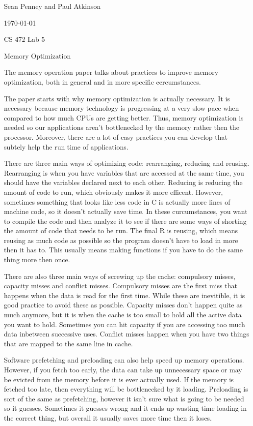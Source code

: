 \documentclass[letterpaper,12pt,titlepage]{article}
\def\name{Sean Penney and Paul Atkinson}
\begin{document}
\hfill \name

\hfill \today

\hfill CS 472 Lab 5


\centerline{\large Memory Optimization}
 
 
The memory operation paper talks about practices to improve memory optimization, both in general and in more specific cercumstances.
\newline
\par
The paper starts with why memory optimization is actually necessary. It is necessary because memory technology is progressing at a very
slow pace when compared to how much CPUs are getting better. Thus, memory optimization is needed so our applications aren't bottlenecked 
by the memory rather then the processor. Moreover, there are a lot of easy practices you can develop that subtely help the run time of 
applications.
\newline
\par
There are three main ways of optimizing code: rearranging, reducing and reusing. Rearranging is when you have variables that are accessed 
at the same time, you should have the variables declared next to each other. Reducing is reducing the amount of code to run, which obviously 
makes it more efficent. However, sometimes something that looks like less code in C is actually more lines of machine code, so it doesn't 
actually save time. In these curcumstances, you want to compile the code and then analyze it to see if there are some ways of shorting 
the amount of code that needs to be run. The final R is reusing, which means reusing as much code as possible so the program doesn't have 
to load in more then it has to. This usually means making functions if you have to do the same thing more then once.
\newline
\par
There are also three main ways of screwing up the cache: compulsory misses, capacity misses and conflict misses. Compulsory misses are 
the first miss that happens when the data is read for the first time. While these are inevitible, it is good practice to avoid these as 
possible. Capacity misses don't happen quite as much anymore, but it is when the cache is too small to hold all the active data you want 
to hold. Sometimes you can hit capacity if you are accessing too much data inbetween successive uses. Conflict misses happen when you have 
two things that are mapped to the same line in cache.
\newline
\par
Software prefetching and preloading can also help speed up memory operations. However, if you fetch too early, the data can take up 
unnecessary space or may be evicted from the memory before it is ever actually used. If the memory is fetched too late, then everything 
will be bottlenecked by it loading. Preloading is sort of the same as prefetching, however it isn't sure what is going to be needed 
so it guesses. Sometimes it guesses wrong and it ends up wasting time loading in the correct thing, but overall it usually saves more 
time then it loses.
\newline
\newline
\end{document}
